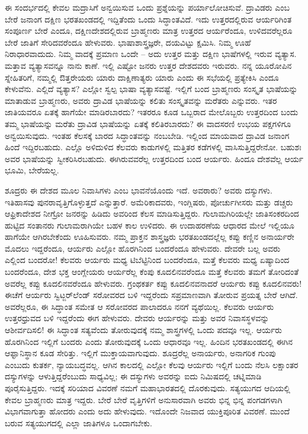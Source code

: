 ಈ ಸಂದರ್ಭದಲ್ಲಿ ಕೇವಲ ಮದ್ರಾಸಿಗೆ ಅನ್ವಯಿಸುವ ಒಂದು ಪ್ರಶ್ನೆಯನ್ನು ಪರ್ಯಾಲೋಚಿಸುವೆ. ದ್ರಾವಿಡರು ಎಂಬ ಬೇರೆ ಜನಾಂಗ ದಕ್ಷಿಣ ಭರತಖಂಡದಲ್ಲಿ ಇದ್ದಿತೆಂದು ಒಂದು ಸಿದ್ಧಾಂತವಿದೆ. ಇದು ಉತ್ತರದಲ್ಲಿರುವ ಆರ್ಯರಿಗಿಂತ ಸಂಪೂರ್ಣ ಬೇರೆ ಎಂದೂ, ದಕ್ಷಿಣದೇಶದಲ್ಲಿರುವ ಬ್ರಾಹ್ಮಣರು ಮಾತ್ರ ಉತ್ತರದ ಆರ್ಯರೆಂದೂ, ಉಳಿದವರೆಲ್ಲರೂ ಬೇರೆ ಜಾತಿಗೆ ಸೇರಿದವರೆಂದೂ ಹೇಳುವರು. ಭಾಷಾಶಾಸ್ತ್ರಜ್ಞರೇ, ದಯವಿಟ್ಟು ಕ್ಷಮಿಸಿ. ನಿಮ್ಮ ಊಹೆ ನಿರಾಧಾರವಾದುದು. ನಿಮ್ಮ ವಾದಕ್ಕೆ ಪ್ರಮಾಣ ಒಂದೇ – ಅದು ಉತ್ತರ ಮತ್ತು ದಕ್ಷಿಣ ಭಾಷೆಗಳಲ್ಲಿ ಇರುವ ವ್ಯತ್ಯಾಸ. ಮತ್ತಾವ ವ್ಯತ್ಯಾಸವನ್ನೂ ನಾನು ಕಾಣೆ. ಇಲ್ಲಿ ಎಷ್ಟೋ ಜನರು ಉತ್ತರ ದೇಶದವರು ಇರುವರು. ನನ್ನ ಯೂರೋಪಿನ ಸ್ನೇಹಿತರಿಗೆ, ನಮ್ಮಲ್ಲಿ ಔತ್ತರೇಯರು ಯಾರು ದಾಕ್ಷಿಣಾತ್ಯರು ಯಾರು ಎಂದು ಈ ಸಭೆಯಲ್ಲಿ ಪ್ರತ್ಯೇಕಿಸಿ ಎಂದೂ ಕೇಳುವೆನು. ಎಲ್ಲಿದೆ ವ್ಯತ್ಯಾಸ? ಎಲ್ಲೋ ಸ್ವಲ್ಪ ಭಾಷಾ ವ್ಯತ್ಯಾಸವಷ್ಟೆ. ಇಲ್ಲಿಗೆ ಬಂದ ಬ್ರಾಹ್ಮಣರು ಸಂಸ್ಕೃತ ಭಾಷೆಯನ್ನು ಮಾತಾಡುವ ಬ್ರಾಹ್ಮಣರು, ಅವರು ದ್ರಾವಿಡ ಭಾಷೆಯನ್ನು ಕಲಿತು ಸಂಸ್ಕೃತವನ್ನು ಮರೆತರು ಎನ್ನುವರು. ಇತರ ಜಾತಿಯವರೂ ಏತಕ್ಕೆ ಹಾಗೆಯೇ ಮಾಡಿರಬಾರದು? ಇತರರೂ ಕೂಡ ಒಬ್ಬರಾದ ಮೇಲೊಬ್ಬರು ಉತ್ತರದಿಂದ ಬಂದು ತಮ್ಮ ಭಾಷೆಯನ್ನು ಮರೆತು ದ್ರಾವಿಡ ಭಾಷೆಯನ್ನು ಏತಕ್ಕೆ ಕಲಿತಿರಬಾರದು? ಈ ವಾದಸರಣಿ ಉಭಯ ಪಕ್ಷಗಳಿಗೂ ಅನ್ವಯಿಸುವುದು. ಇಂತಹ ಕೆಲಸಕ್ಕೆ ಬಾರದ ಸಿದ್ಧಾಂತವನ್ನು ನಂಬಬೇಡಿ. ಇಲ್ಲಿಂದ ಮಾಯವಾದ ದ್ರಾವಿಡ ಜನಾಂಗ ಹಿಂದೆ ಇದ್ದಿರಬಹುದು. ಎಲ್ಲೊ ಅಳಿದುಳಿದ ಕೆಲವರು ಕಾಡುಗಳಲ್ಲಿ ಮತ್ತಿತರ ಕಡೆಗಳಲ್ಲಿ ವಾಸಿಸುತ್ತಿದ್ದರೇನೋ. ಬಹುಶಃ ಅವರ ಭಾಷೆಯನ್ನು ಸ್ವೀಕರಿಸಿರಬಹುದು. ಈಗಿರುವವರೆಲ್ಲ ಉತ್ತರದಿಂದ ಬಂದ ಆರ್ಯರು. ಹಿಂದೂ ದೇಶವೆಲ್ಲ ಆರ್ಯ ಭೂಮಿ, ಬೇರೆಯಲ್ಲ.

ಶೂದ್ರರು ಈ ದೇಶದ ಮೂಲ ನಿವಾಸಿಗಳು ಎಂಬ ಭಾವನೆಯೊಂದು ಇದೆ. ಅವರಾರು? ಅವರು ದಸ್ಯುಗಳು. ಇತಿಹಾಸವು ಪುನರಾವೃತ್ತಿಗೊಳ್ಳುತ್ತದೆ ಎನ್ನುತ್ತಾರೆ. ಅಮೆರಿಕಾದವರು, ಇಂಗ್ಲಿಷರು, ಪೋರ್ಚುಗೀಸರು ಮತ್ತು ಡಚ್ಚರು ಆಫ್ರಿಕಾದೇಶದ ನೀಗ್ರೋ ಜನರನ್ನು ಹಿಡಿದು ಅವರಿಂದ ಕೆಲಸ ಮಾಡಿಸುತ್ತಿದ್ದರು. ಗುಲಾಮಗಿರಿಯಲ್ಲೇ ಜಾತಿಸಂಕರದಿಂದ ಹುಟ್ಟಿದ ಸಂತಾನರು ಗುಲಾಮರಾಗಿಯೇ ಬಹಳ ಕಾಲ ಉಳಿದರು. ಈ ಉದಾಹರಣೆಯ ಆಧಾರದ ಮೇಲೆ ಇಲ್ಲಿಯೂ ಹಾಗೆಯೇ ಆಗಿರಬೇಕೆಂದು ಊಹಿಸುವರು. ನಮ್ಮ ಪ್ರಾಕ್ತನ ಶಾಸ್ತ್ರಜ್ಞರು ಭರತಖಂಡದಲ್ಲೆಲ್ಲ ಕಪ್ಪು ಕಣ್ಣಿನ ಅನಾರ್ಯರೇ ಮೊದಲು ಇದ್ದರೆಂದೂ, ಆರ್ಯರು ಎಲ್ಲೋ ಹೊರಗಿನಿಂದ ಬಂದರೆಂದೂ ಹೇಳುವರು. ದೇವರೇ ಬಲ್ಲ ಅವರು ಎಲ್ಲಿಂದ ಬಂದರೋ! ಕೆಲವರು ಆರ್ಯರು ಮಧ್ಯ ಟಿಬೆಟ್ಟಿನಿಂದ ಬಂದರೆಂದೂ, ಮತ್ತೆ ಕೆಲವರು ಮಧ್ಯ ಏಷ್ಯಾದಿಂದ ಬಂದರೆಂದೂ, ದೇಶ ಭಕ್ತ ಆಂಗ್ಲೇಯರು ಆರ್ಯರೆಲ್ಲ ಕೆಂಪು ಕೂದಲಿನವರೆಂದೂ ಮತ್ತೆ ಕೆಲವರು ತಮಗೆ ತೋರಿದಂತೆ ಅವರೆಲ್ಲ ಕಪ್ಪು ಕೂದಲಿನವರೆಂದೂ ಹೇಳುವರು. ಗ್ರಂಥಕರ್ತ ಕಪ್ಪು ಕೂದಲಿನವನಾದರೆ ಆರ್ಯರು ಕಪ್ಪು ಕೂದಲಿನವರು! ಈಚೆಗೆ ಆರ್ಯರು ಸ್ವಿಟ್ಜರ್​ಲೆಂಡ್​ ಸರೋವರದ ಬಳಿ ಇದ್ದರೆಂದು ಸಪ್ರಮಾಣವಾಗಿ ತೋರುವ ಪ್ರಯತ್ನ ಬೇರೆ ಆಗಿದೆ. ಅವರೆಲ್ಲರೂ, ಈ ಸಿದ್ಧಾಂತ ಸಮೇತ ಆ ಸರೋವರದ ಪಾಲಾದರೂ ನನಗೆ ವ್ಯಥೆಯಿಲ್ಲ. ಕೆಲವರು ಆರ್ಯರು ಉತ್ತರಧ್ರುವದ ಬಳಿ ಇದ್ದರೆಂದು ಈಗ ಹೇಳುವರು. ದೇವರು ಆರ್ಯರನ್ನು ಮತ್ತು ಅವರ ನಿವಾಸಸ್ಥಳವನ್ನು ಆಶೀರ್ವದಿಸಲಿ! ಈ ಸಿದ್ಧಾಂತ ಸತ್ಯವೆಂದು ತೋರುವುದಕ್ಕೆ ನಮ್ಮ ಶಾಸ್ತ್ರಗಳಲ್ಲಿ ಒಂದು ಪದವೂ ಇಲ್ಲ. ಆರ್ಯರು ಹೊರಗಿನಿಂದ ಇಲ್ಲಿಗೆ ಬಂದರು ಎಂದು ತೋರುವುದಕ್ಕೆ ಒಂದು ಆಧಾರವೂ ಇಲ್ಲ. ಹಿಂದಿನ ಭರತಖಂಡದಲ್ಲಿ ಈಗಿನ ಆಫ್ಘಾನಿಸ್ಥಾನ ಕೂಡ ಸೇರಿತ್ತು. ಇಲ್ಲಿಗೆ ಮುಕ್ತಾಯವಾಗುವುದು. ಶೂದ್ರರೆಲ್ಲ ಅನಾರ್ಯರು, ಅನಾಗರಿಕ ಗುಂಪು ಎಂಬುದು ಕುತರ್ಕ, ನ್ಯಾಯಬದ್ಧವಲ್ಲ. ಆಗಿನ ಕಾಲದಲ್ಲಿ ಎಲ್ಲೋ ಕೆಲವು ಆರ್ಯರು ಇಲ್ಲಿಗೆ ಬಂದು ನೆಲಸಿ ಲಕ್ಷಾಂತರ ದಸ್ಯುಗಳನ್ನು ಆಳುತ್ತಿದ್ದರೆಂಬುದು ಸಾಧ್ಯವಿಲ್ಲ; ಈ ದಸ್ಯುಗಳು ಅವರನ್ನು ಐದು ನಿಮಿಷದಲ್ಲಿ ಚಟ್ನಿಮಾಡಿ ಪೂರೈಸುತ್ತಿದ್ದರು. ಇದಕ್ಕೆ ಸರಿಯಾದ ವಿವರಣೆ ನಮಗೆ ಮಹಾಭಾರತದಲ್ಲಿ ದೊರಕುವುದು. ಸತ್ಯಯುಗದ ಆದಿಯಲ್ಲಿ ಕೇವಲ ಬ್ರಾಹ್ಮಣರು ಮಾತ್ರ ಇದ್ದರು. ಬೇರೆ ಬೇರೆ ವೃತ್ತಿಗಳಿಗೆ ಅನುಸಾರವಾಗಿ ಅವರು ಭಿನ್ನ ಭಿನ್ನ ಪಂಗಡಗಳಾಗಿ ವಿಭಾಗವಾಗುತ್ತಾ ಹೋದರು ಎಂದು ಅದು ಹೇಳುವುದು. ಇದೊಂದೇ ನಿಜವಾದ ಯುಕ್ತಿಪೂರಿತ ವಿವರಣೆ. ಮುಂದೆ ಬರುವ ಸತ್ಯಯುಗದಲ್ಲಿ ಎಲ್ಲಾ ಜಾತಿಗಳೂ ಒಂದಾಗಬೇಕು.

